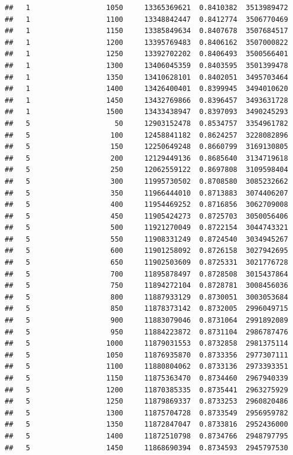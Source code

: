 \documentclass[11pt,]{article}
\begin{document}
\begin{verbatim}
##   1                  1050     13365369621  0.8410382  3513989472
##   1                  1100     13348842447  0.8412774  3506770469
##   1                  1150     13385849634  0.8407678  3507684517
##   1                  1200     13395769483  0.8406162  3507000822
##   1                  1250     13392702202  0.8406493  3500566401
##   1                  1300     13406045359  0.8403595  3501399478
##   1                  1350     13410628101  0.8402051  3495703464
##   1                  1400     13426400401  0.8399945  3494010620
##   1                  1450     13432769866  0.8396457  3493631728
##   1                  1500     13433438947  0.8397093  3490245293
##   5                    50     12903152478  0.8534757  3354961782
##   5                   100     12458841182  0.8624257  3228082896
##   5                   150     12250649248  0.8660799  3169130805
##   5                   200     12129449136  0.8685640  3134719618
##   5                   250     12062559122  0.8697808  3109598404
##   5                   300     11995730502  0.8708580  3085232662
##   5                   350     11966444010  0.8713883  3074406207
##   5                   400     11954469252  0.8716856  3062709008
##   5                   450     11905424273  0.8725703  3050056406
##   5                   500     11921270049  0.8722154  3044743321
##   5                   550     11908331249  0.8724540  3034945267
##   5                   600     11901258092  0.8726158  3027942695
##   5                   650     11902503609  0.8725331  3021776728
##   5                   700     11895878497  0.8728508  3015437864
##   5                   750     11894272104  0.8728781  3008456036
##   5                   800     11887933129  0.8730051  3003053684
##   5                   850     11878373142  0.8732005  2996049715
##   5                   900     11883079046  0.8731064  2991892089
##   5                   950     11884223872  0.8731104  2986787476
##   5                  1000     11879031553  0.8732858  2981375114
##   5                  1050     11876935870  0.8733356  2977307111
##   5                  1100     11880804062  0.8733136  2973393351
##   5                  1150     11875363470  0.8734460  2967940339
##   5                  1200     11870385335  0.8735441  2963275929
##   5                  1250     11879869337  0.8733253  2960820486
##   5                  1300     11875704728  0.8733549  2956959782
##   5                  1350     11872847047  0.8733816  2952436000
##   5                  1400     11872510798  0.8734766  2948797795
##   5                  1450     11868690394  0.8734593  2945797530

\end{verbatim}
\end{document}
